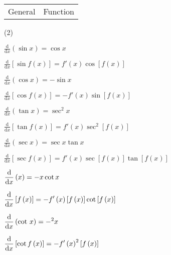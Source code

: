 \documentclass[11pt,a4paper]{book}
\let\csc\relax
\DeclareMathOperator{\csc}{cosec}
\begin{document}
\begin{tcolorbox}[colback=blue!5, colframe=black, boxrule=.4pt, sharpish corners]

\begin{tabular}{>{\centering}p{4.5cm}>{\centering}p{10cm}}
General & Function\tabularnewline
\end{tabular}

\begin{tasks}[style=itemize,label-width=3.5ex,column-sep=-1cm](2)

\task  ${\displaystyle \frac{\mathrm{d}}{\mathrm{d}x}\left(\sin x\right)=\cos x}$

\task ${\displaystyle \frac{\mathrm{d}}{\mathrm{d}x}\left[\sin f\left(x\right)\right]=f'\left(x\right)\cos\left[f\left(x\right)\right]}$

\task  ${\displaystyle \frac{\mathrm{d}}{\mathrm{d}x}\left(\cos x\right)=-\sin x}$

\task  ${\displaystyle \frac{\mathrm{d}}{\mathrm{d}x}\left[\cos f\left(x\right)\right]=-f'\left(x\right)\sin\left[f\left(x\right)\right]}$

\task  ${\displaystyle \frac{\mathrm{d}}{\mathrm{d}x}\left(\tan x\right)=\sec^{2}x}$

\task  ${\displaystyle \frac{\mathrm{d}}{\mathrm{d}x}\left[\tan f\left(x\right)\right]=f'\left(x\right)\sec^{2}\left[f\left(x\right)\right]}$

\task  ${\displaystyle \frac{\mathrm{d}}{\mathrm{d}x}\left(\sec x\right)=\sec x\tan x}$

\task  ${\displaystyle \frac{\mathrm{d}}{\mathrm{d}x}\left[\sec f\left(x\right)\right]=f'\left(x\right)\sec\left[f\left(x\right)\right]}\tan\left[f\left(x\right)\right]$

\task  ${\displaystyle \frac{\mathrm{d}}{\mathrm{d}x}\left(\csc x\right)=-\csc x\cot x}$

\task  ${\displaystyle \frac{\mathrm{d}}{\mathrm{d}x}\left[\csc f\left(x\right)\right]=-f'\left(x\right)\csc\left[f\left(x\right)\right]}\cot\left[f\left(x\right)\right]$

\task  ${\displaystyle \frac{\mathrm{d}}{\mathrm{d}x}\left(\cot\thinspace x\right)=-\csc^{2}x}$

\task  ${\displaystyle \frac{\mathrm{d}}{\mathrm{d}x}\left[\cot f\left(x\right)\right]=-f'\left(x\right)\csc^{2}\left[f\left(x\right)\right]}$

\end{tasks}
\end{tcolorbox}
\end{document}
